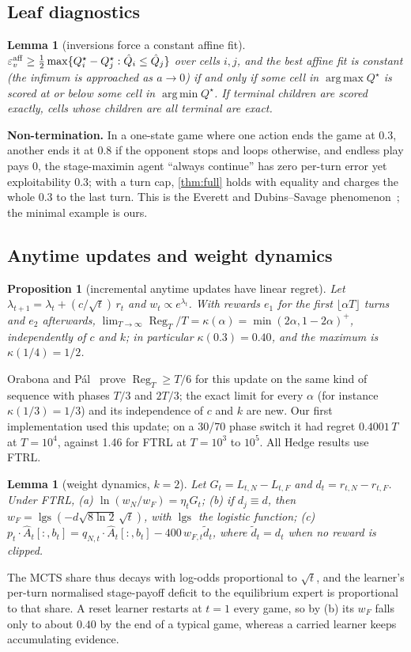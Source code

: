 \documentclass[10pt]{article}
\theoremstyle{plain}
\newtheorem{lemma}[theorem]{Lemma}
\newtheorem{proposition}[theorem]{Proposition}
\theoremstyle{definition}
\theoremstyle{remark}
\newcommand{\epsv}{\varepsilon_v}
\newcommand{\Ahat}{\hat A}
\newcommand{\Qhat}{\hat Q}
\newcommand{\Qstar}{Q^\star}
\DeclareMathOperator{\Reg}{Reg}
\DeclareMathOperator{\lgs}{lgs}
\DeclareMathOperator*{\argmin}{arg\,min}
\DeclareMathOperator*{\argmax}{arg\,max}
\begin{document}
\subsection{Leaf diagnostics}
\label{app:leaf}
\begin{lemma}[inversions force a constant affine fit]\label{lem:R6b}
$\epsv^{\rm aff}\ge\frac12\max\{\Qstar_i-\Qstar_j:\Qhat_i\le\Qhat_j\}$ over cells $i,j$, and the best affine fit is constant (the infimum is approached as $a\to0$) if and only if some cell in $\argmax\Qstar$ is scored at or below some cell in $\argmin\Qstar$. If terminal children are scored exactly, cells whose children are all terminal are exact.
\end{lemma}
\textbf{Non-termination.} In a one-state game where one action ends the game at $0.3$, another ends it at $0.8$ if the opponent stops and loops otherwise, and endless play pays 0, the stage-maximin agent ``always continue'' has zero per-turn error yet exploitability $0.3$; with a turn cap, \cref{thm:full} holds with equality and charges the whole $0.3$ to the last turn. This is the Everett and Dubins--Savage phenomenon~\cite{Everett57,DS65,MS96}; the minimal example is ours.

\subsection{Anytime updates and weight dynamics}
\begin{proposition}[incremental anytime updates have linear regret]\label{prop:R1}
Let $\lambda_{t+1}=\lambda_t+(c/\sqrt t)\,r_t$ and $w_t\propto e^{\lambda_t}$. With rewards $e_1$ for the first $\lfloor\alpha T\rfloor$ turns and $e_2$ afterwards, $\lim_{T\to\infty}\Reg_T/T=\kappa(\alpha)=\min(2\alpha,1-2\alpha)^+$, independently of $c$ and $k$; in particular $\kappa(0.3)=0.40$, and the maximum is $\kappa(1/4)=1/2$.
\end{proposition}
Orabona and P\'al~\cite{OP18} prove $\Reg_T\ge T/6$ for this update on the same kind of sequence with phases $T/3$ and $2T/3$; the exact limit for every $\alpha$ (for instance $\kappa(1/3)=1/3$) and its independence of $c$ and $k$ are new. Our first implementation used this update; on a 30/70 phase switch it had regret $0.4001\,T$ at $T=10^4$, against 1.46 for FTRL at $T=10^3$ to $10^5$. All Hedge results use FTRL.

\begin{lemma}[weight dynamics, $k=2$]\label{lem:R3}
Let $G_t=L_{t,N}-L_{t,F}$ and $d_t=r_{t,N}-r_{t,F}$. Under FTRL, (a) $\ln(w_N/w_F)=\eta_tG_t$; (b) if $d_j\equiv d$, then $w_F=\lgs(-d\sqrt{8\ln2}\,\sqrt t)$, with $\lgs$ the logistic function; (c) $p_t\cdot\Ahat_t[:,b_t]=q_{N,t}\cdot\Ahat_t[:,b_t]-400\,w_{F,t}\tilde d_t$, where $\tilde d_t=d_t$ when no reward is clipped.
\end{lemma}
The MCTS share thus decays with log-odds proportional to $\sqrt t$, and the learner's per-turn normalised stage-payoff deficit to the equilibrium expert is proportional to that share. A reset learner restarts at $t=1$ every game, so by (b) its $w_F$ falls only to about $0.40$ by the end of a typical game, whereas a carried learner keeps accumulating evidence.
\end{document}
